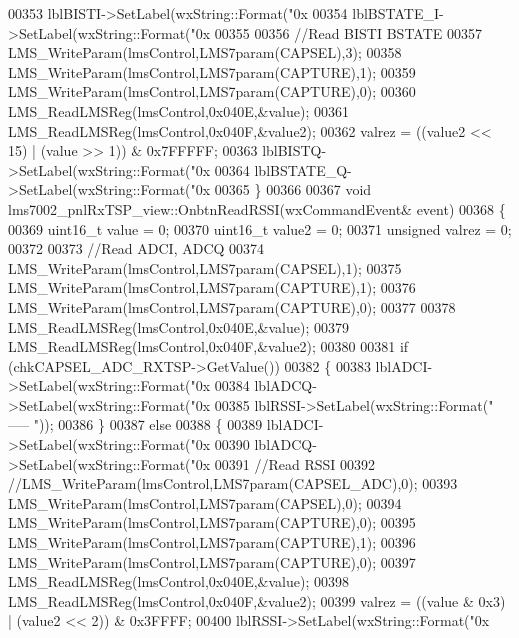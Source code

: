 \begin{DoxyCode}
{{{{00353     lblBISTI->SetLabel(wxString::Format(\textcolor{stringliteral}{"0x%
00354     lblBSTATE_I->SetLabel(wxString::Format(\textcolor{stringliteral}{"0x%
00355 
00356     \textcolor{comment}{//Read BISTI BSTATE}
00357     LMS_WriteParam(lmsControl,LMS7param(CAPSEL),3);
00358     LMS_WriteParam(lmsControl,LMS7param(CAPTURE),1);
00359     LMS_WriteParam(lmsControl,LMS7param(CAPTURE),0);
00360     LMS_ReadLMSReg(lmsControl,0x040E,&value);
00361     LMS_ReadLMSReg(lmsControl,0x040F,&value2);
00362     valrez = ((value2 << 15) | (value >> 1)) & 0x7FFFFF;
00363     lblBISTQ->SetLabel(wxString::Format(\textcolor{stringliteral}{"0x%
00364     lblBSTATE_Q->SetLabel(wxString::Format(\textcolor{stringliteral}{"0x%
00365 \}
00366 
00367 \textcolor{keywordtype}{void} lms7002_pnlRxTSP_view::OnbtnReadRSSI(wxCommandEvent& event)
00368 \{
00369     uint16\_t value = 0;
00370     uint16\_t value2 = 0;
00371     \textcolor{keywordtype}{unsigned} valrez = 0;
00372 
00373     \textcolor{comment}{//Read ADCI, ADCQ}
00374     LMS_WriteParam(lmsControl,LMS7param(CAPSEL),1);
00375     LMS_WriteParam(lmsControl,LMS7param(CAPTURE),1);
00376     LMS_WriteParam(lmsControl,LMS7param(CAPTURE),0);
00377 
00378     LMS_ReadLMSReg(lmsControl,0x040E,&value);
00379     LMS_ReadLMSReg(lmsControl,0x040F,&value2);
00380 
00381     \textcolor{keywordflow}{if} (chkCAPSEL_ADC_RXTSP->GetValue())
00382     \{
00383         lblADCI->SetLabel(wxString::Format(\textcolor{stringliteral}{"0x%
00384         lblADCQ->SetLabel(wxString::Format(\textcolor{stringliteral}{"0x%
00385         lblRSSI->SetLabel(wxString::Format(\textcolor{stringliteral}{" ----- "}));
00386     \}
00387     \textcolor{keywordflow}{else}
00388     \{
00389         lblADCI->SetLabel(wxString::Format(\textcolor{stringliteral}{"0x%
00390         lblADCQ->SetLabel(wxString::Format(\textcolor{stringliteral}{"0x%
00391         \textcolor{comment}{//Read RSSI}
00392         \textcolor{comment}{//LMS\_WriteParam(lmsControl,LMS7param(CAPSEL\_ADC),0);}
00393         LMS_WriteParam(lmsControl,LMS7param(CAPSEL),0);
00394         LMS_WriteParam(lmsControl,LMS7param(CAPTURE),0);
00395         LMS_WriteParam(lmsControl,LMS7param(CAPTURE),1);
00396         LMS_WriteParam(lmsControl,LMS7param(CAPTURE),0);
00397         LMS_ReadLMSReg(lmsControl,0x040E,&value);
00398         LMS_ReadLMSReg(lmsControl,0x040F,&value2);
00399         valrez = ((value & 0x3) | (value2 << 2)) & 0x3FFFF;
00400         lblRSSI->SetLabel(wxString::Format(\textcolor{stringliteral}{"0x%
}}}}}}}}}}}}}
\end{DoxyCode}
